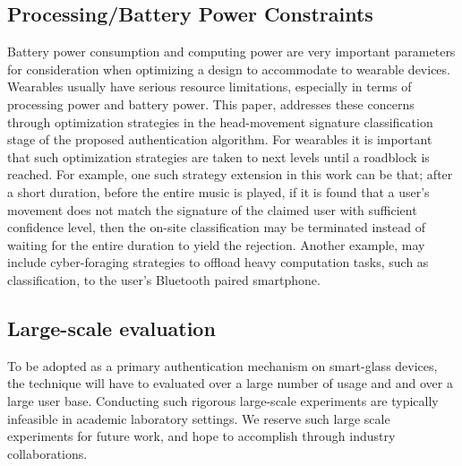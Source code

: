 \subsection{Processing/Battery Power Constraints}
Battery power consumption and computing power are very important parameters
for consideration when optimizing a design to accommodate to wearable devices.
Wearables usually have serious resource limitations, especially in terms of
processing power and battery power.
This paper, addresses these concerns through optimization strategies in the
head-movement signature classification stage of the proposed authentication
algorithm. For wearables it is important that such optimization strategies are
taken to next levels until a roadblock is reached.
For example, one such strategy extension in this work can be that; after a
short duration, before the entire music is played, if it is found that a
user's movement does not match the signature of the claimed user
with sufficient confidence level, then the on-site classification may be
terminated  instead of waiting for the entire duration to yield the rejection.
Another example, may include cyber-foraging strategies to offload heavy
computation tasks, such as classification, to the user's Bluetooth paired
smartphone.

\subsection{Large-scale evaluation}
To be adopted as a primary authentication mechanism on smart-glass devices,
the technique will have to evaluated over a large number of usage and
and over a large user base. Conducting such rigorous large-scale experiments
are typically infeasible in academic laboratory settings. We reserve such
large scale experiments for future work, and hope to accomplish through
industry collaborations.

